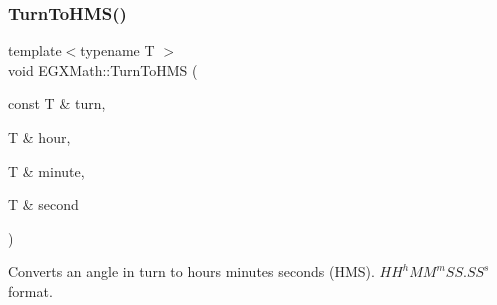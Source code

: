 \subsubsection{\texorpdfstring{Turn\+To\+H\+M\+S()}{TurnToHMS()}}
{\footnotesize\ttfamily template$<$typename T $>$ \\
void E\+G\+X\+Math\+::\+Turn\+To\+H\+MS (\begin{DoxyParamCaption}\item[{const T \&}]{turn,  }\item[{T \&}]{hour,  }\item[{T \&}]{minute,  }\item[{T \&}]{second }\end{DoxyParamCaption})}



Converts an angle in turn to hours minutes seconds (H\+MS). ${HH}^h{MM}^m{SS.SS}^s$ format. 


